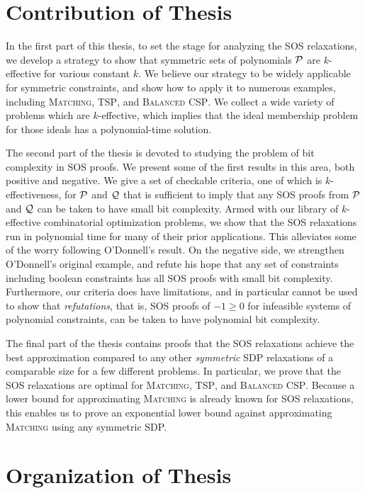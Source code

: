 \section{Contribution of Thesis}\label{sec:intro_contrib}

In the first part of this thesis, to set the stage for analyzing the SOS relaxations, we develop a strategy to show that symmetric sets of polynomials $\mathcal P$ are $k$-effective for various constant $k$. 
We believe our strategy to be widely applicable for symmetric constraints, and show how to apply it to numerous examples, including \textsc{Matching}, \textsc{TSP}, and \textsc{Balanced CSP}. 
We collect a wide variety of problems which are $k$-effective, which implies that the ideal membership problem for those ideals has a polynomial-time solution. 

The second part of the thesis is devoted to studying the problem of bit complexity in SOS proofs. We present some of the first results in this area, both positive and negative. We give a set of checkable criteria, one of which is $k$-effectiveness, for $\mathcal P$ and $\mathcal Q$ that is sufficient to imply that any SOS proofs from $\mathcal P$ and $\mathcal Q$ can be taken to have small bit complexity. Armed with our library of $k$-effective combinatorial optimization problems, we show that the SOS relaxations run in polynomial time for many of their prior applications. This alleviates some of the worry following O'Donnell's result. 
On the negative side, we strengthen O'Donnell's original example, and refute his hope that any set of constraints including boolean constraints has all SOS proofs with small bit complexity. 
Furthermore, our criteria does have limitations, and in particular cannot be used to show that \emph{refutations}, that is, SOS proofs of $-1 \geq 0$ for infeasible systems of polynomial constraints, can be taken to have polynomial bit complexity.

The final part of the thesis contains proofs that the SOS relaxations achieve the best approximation compared to any other \emph{symmetric} SDP relaxations of a comparable size for a few different problems. In particular, we prove that the SOS relaxations are optimal for \textsc{Matching}, \textsc{TSP}, and \textsc{Balanced CSP}. Because a lower bound for approximating \textsc{Matching} is already known for SOS relaxations, this enables us to prove an exponential lower bound against approximating \textsc{Matching} using any symmetric SDP. 

\section{Organization of Thesis}

